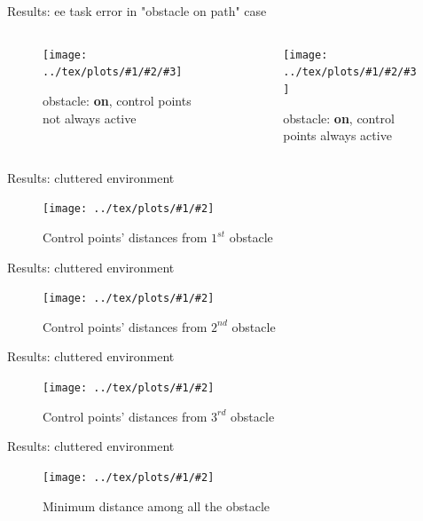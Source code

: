 \documentclass[11pt]{beamer}
\newcommand{\imgG}[3]{\texttt{[image: ../tex/plots/\#1/\#2]}}
\newcommand{\img}[4]{\texttt{[image: ../tex/plots/\#1/\#2/\#3]}}
\begin{document}
\begin{frame}{Results: ee task error in "obstacle on path" case}
\begin{columns}
\begin{column}{.5\textwidth}
\begin{figure}[H]
\img{on}{notAlways}{ee_task_error.eps}{.4}
\caption{obstacle: \textbf{on}, control points not always active}
\end{figure}
\end{column}
\begin{column}{.5\textwidth}
\begin{figure}[H]
\img{on}{always}{ee_task_error.eps}{.4}
\caption{obstacle: \textbf{on}, control points always active}
\end{figure}
\end{column}
\end{columns}
\end{frame}

\begin{frame}{Results: cluttered environment}
\begin{figure}[H]
\label{3obstDist}
\imgG{3obs}{control_points_distances.eps}{.5}
\caption{Control points' distances from $1^{st}$ obstacle}
\end{figure}
\end{frame}
\begin{frame}{Results: cluttered environment}
\begin{figure}[H]
\imgG{3obs}{control_points_distances_2.eps}{.5}
\caption{Control points' distances from $2^{nd}$ obstacle}
\end{figure}
\end{frame}
\begin{frame}{Results: cluttered environment}
\begin{figure}[H]
\imgG{3obs}{control_points_distances_3.eps}{.5}
\caption{Control points' distances from $3^{rd}$ obstacle}
\end{figure}
\end{frame}
\begin{frame}{Results: cluttered environment}
\begin{figure}[H]
\imgG{3obs}{min_3.eps}{.5}
\caption{Minimum distance among all the obstacle}
\end{figure}
\end{frame}
\end{document}
